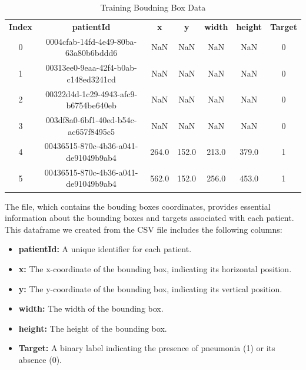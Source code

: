 \begin{table}[h!]
    \centering
    \caption{Training Boudning Box Data}
    \label{tab:cha-2 table1}
    \begin{tabular}{c|c|c|c|c|c|c}
        \rowcolor{gray!20}
        \textbf{Index} & \textbf{patientId}                   & \textbf{x} & \textbf{y} & \textbf{width} & \textbf{height} & \textbf{Target} \\
        0              & 0004cfab-14fd-4e49-80ba-63a80b6bddd6 & NaN        & NaN        & NaN            & NaN             & 0               \\
        1              & 00313ee0-9eaa-42f4-b0ab-c148ed3241cd & NaN        & NaN        & NaN            & NaN             & 0               \\
        2              & 00322d4d-1c29-4943-afc9-b6754be640eb & NaN        & NaN        & NaN            & NaN             & 0               \\
        3              & 003df8a0-6bf1-40ed-b54c-ac657f8495c5 & NaN        & NaN        & NaN            & NaN             & 0               \\
        4              & 00436515-870c-4b36-a041-de91049b9ab4 & 264.0      & 152.0      & 213.0          & 379.0           & 1               \\
        5              & 00436515-870c-4b36-a041-de91049b9ab4 & 562.0      & 152.0      & 256.0          & 453.0           & 1               \\
    \end{tabular}
\end{table}

The file, which contains the bouding boxes coordinates, provides essential information about the bounding boxes and targets associated with each patient. This dataframe we created from the CSV file includes the following columns:

\begin{itemize}
    \item \textbf{patientId:} A unique identifier for each patient.
    \item \textbf{x:} The x-coordinate of the bounding box, indicating its horizontal position.
    \item \textbf{y:} The y-coordinate of the bounding box, indicating its vertical position.
    \item \textbf{width:} The width of the bounding box.
    \item \textbf{height:} The height of the bounding box.
    \item \textbf{Target:} A binary label indicating the presence of pneumonia (1) or its absence (0).
\end{itemize}

